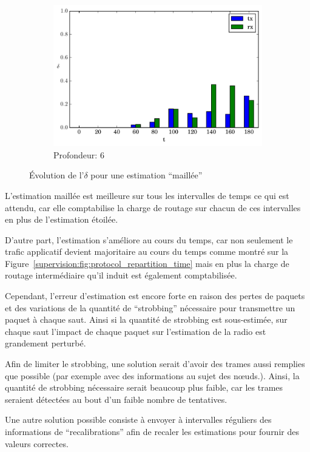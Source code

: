 \begin{figure}[h]
\begin{subfigure}{0.3\textwidth}
    \includegraphics[width=\textwidth]{img/evolution_route_6.pdf}
    \caption{Profondeur: 6}
    \label{supervision:fig:route_6}
  \end{subfigure}
  \caption{Évolution de l'$\delta$ pour une estimation ``maillée''}
  \label{supervision:fig:route}
\end{figure}

L'estimation maillée est meilleure sur tous les intervalles de temps ce qui est attendu, car elle comptabilise la charge de routage sur chacun de ces intervalles en plus de l'estimation étoilée.

D'autre part, l'estimation s'améliore au cours du temps, car non seulement le trafic applicatif devient majoritaire au cours du temps comme montré sur la Figure~\ref{supervision:fig:protocol_repartition_time} mais en plus la charge de routage intermédiaire qu'il induit est également comptabilisée.


Cependant, l'erreur d'estimation est encore forte en raison des pertes de paquets et des variations de la quantité de ``strobbing'' nécessaire pour transmettre un paquet à chaque saut.
Ainsi si la quantité de strobbing est sous-estimée, sur chaque saut l'impact de chaque paquet sur l'estimation de la radio est grandement perturbé.

Afin de limiter le strobbing, une solution serait d'avoir des trames aussi remplies que possible (par exemple avec des informations au sujet des nœuds.).
Ainsi, la quantité de strobbing nécessaire serait beaucoup plus faible, car les trames seraient détectées au bout d'un faible nombre de tentatives.

Une autre solution possible consiste à envoyer à intervalles réguliers des informations de ``recalibrations'' afin de recaler les estimations pour fournir des valeurs correctes.

